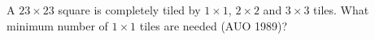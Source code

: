 A $23 \times 23$ square is completely tiled by $1 \times 1$, $2 \times 2$ and $3 \times 3$ tiles. What minimum number of $1 \times 1$ tiles are needed (AUO 1989)?
